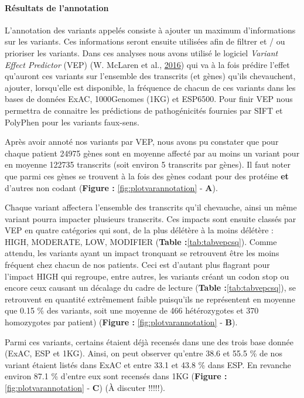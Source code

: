 \documentclass[12pt,twoside]{reedthesis}
\theoremstyle{definition}
\theoremstyle{definition}
\theoremstyle{remark}
\begin{document}
  \newpage
  
  \paragraph{Résultats de l'annotation}\label{resultats-de-lannotation}
  
  L'annotation des variants appelés consiste à ajouter un maximum
  d'informations sur les variants. Ces informations seront ensuite
  utilisées afin de filtrer et / ou prioriser les variants. Dans ces
  analyses nous avons utilisé le logiciel \emph{Variant Effect Predictor}
  (VEP) (W. McLaren et al., \protect\hyperlink{ref-McLaren2016}{2016}) qui
  va à la fois prédire l'effet qu'auront ces variants sur l'ensemble des
  transcrits (et gènes) qu'ils chevauchent, ajouter, lorsqu'elle est
  disponible, la fréquence de chacun de ces variants dans les bases de
  données ExAC, 1000Genomes (1KG) et ESP6500. Pour finir VEP nous
  permettra de connaitre les prédictions de pathogénicités fournies par
  SIFT et PolyPhen pour les variants faux-sens.
  
  Après avoir annoté nos variants par VEP, nous avons pu constater que
  pour chaque patient 24975 gènes sont en moyenne affecté par au moins un
  variant pour en moyenne 122735 transcrits (soit environ 5 transcrits par
  gènes). Il faut noter que parmi ces gènes se trouvent à la fois des
  gènes codant pour des protéine \textbf{et} d'autres non codant
  (\textbf{Figure : }\ref{fig:plotvarannotation} - \textbf{A}).
  
  Chaque variant affectera l'ensemble des transcrits qu'il chevauche,
  ainsi un même variant pourra impacter plusieurs transcrits. Ces impacts
  sont ensuite classés par VEP en quatre catégories qui sont, de la plus
  délétère à la moins délétère : HIGH, MODERATE, LOW, MODIFIER
  (\textbf{Table :}\ref{tab:tabvepcsq}). Comme attendu, les variants ayant
  un impact tronquant se retrouvent être les moins fréquent chez chacun de
  nos patients. Ceci est d'autant plus flagrant pour l'impact HIGH qui
  regroupe, entre autres, les variants créant un codon stop ou encore ceux
  causant un décalage du cadre de lecture (\textbf{Table
  :}\ref{tab:tabvepcsq}), se retrouvent en quantité extrêmement faible
  puisqu'ils ne représentent en moyenne que 0.15 \% des variants, soit une
  moyenne de 466 hétérozygotes et 370 homozygotes par patient)
  (\textbf{Figure : }\ref{fig:plotvarannotation} - \textbf{B}).
  
  Parmi ces variants, certains étaient déjà recensés dans une des trois
  base donnée (ExAC, ESP et 1KG). Ainsi, on peut observer qu'entre 38.6 et
  55.5 \% de nos variant étaient listés dans ExAC et entre 33.1 et 43.8 \%
  dans ESP. En revanche environ 87.1 \% d'entre eux sont recensés dans 1KG
  (\textbf{Figure : }\ref{fig:plotvarannotation} - \textbf{C}) (À discuter
  !!!!!).
  
\end{document}
